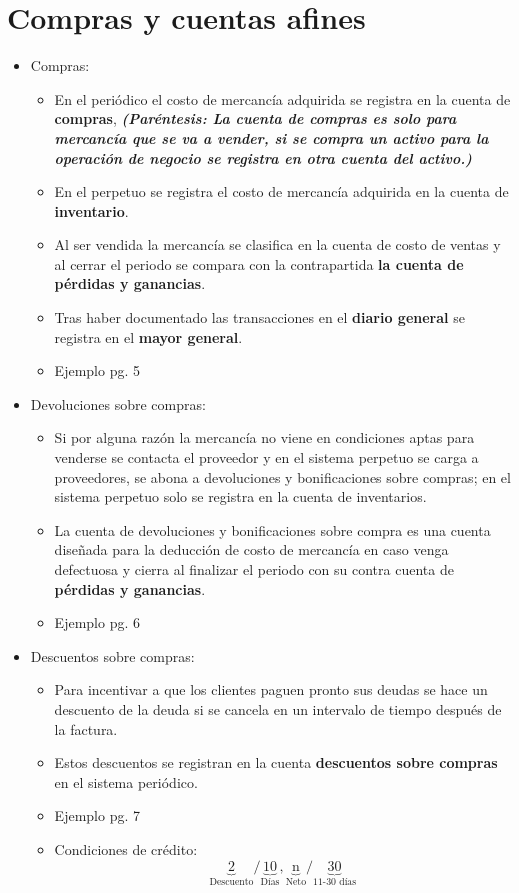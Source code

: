 \documentclass{article}
\begin{document}
\section{Compras y cuentas afines}
\begin{itemize}
    \item Compras:
    \begin{itemize}
        \item En el periódico el costo de mercancía adquirida se registra en la cuenta de \textbf{compras}, \emph{\textbf{(Paréntesis: La cuenta de compras es solo para mercancía que se va a vender, si se compra un activo para la operación de negocio se registra en otra cuenta del activo.}\textbf{)}}
        \item En el perpetuo se registra el costo de mercancía adquirida en la cuenta de \textbf{inventario}.
        \item Al ser vendida la mercancía se clasifica en la cuenta de costo de ventas y al cerrar el periodo se compara con la contrapartida \textbf{la cuenta de pérdidas y ganancias}.
        \item Tras haber documentado las transacciones en el \textbf{diario general} se registra en el  \textbf{mayor general}.
        \item Ejemplo pg. 5
    \end{itemize}
        
    \item Devoluciones sobre compras:
    \begin{itemize}
        \item Si por alguna razón la mercancía no viene en condiciones aptas para venderse se contacta el proveedor y en el sistema perpetuo se carga a proveedores, se abona a devoluciones y bonificaciones sobre compras; en el sistema perpetuo solo se registra en la cuenta de inventarios.
        \item La cuenta de devoluciones y bonificaciones sobre compra es una cuenta diseñada para la deducción de costo de mercancía en caso venga defectuosa y cierra al finalizar el periodo con su contra cuenta de \textbf{pérdidas y ganancias}.
        \item Ejemplo pg. 6
    \end{itemize}


    
    \item Descuentos sobre compras:
    \begin{itemize}
        \item Para incentivar a que los clientes paguen pronto sus deudas se hace un descuento de la deuda si se cancela en un intervalo de tiempo después de la factura.
        \item Estos descuentos se registran en la cuenta \textbf{descuentos sobre compras} en el sistema periódico.
        \item Ejemplo pg. 7
        \item Condiciones de crédito:
        \[
          \underbrace{2}_{\text{Descuento}} / \underbrace{\text{10}}_{\text{Días}}, \underbrace{\text{n}}_{\text{Neto}} / \underbrace{30}_{\text{11-30 días}}
        \]
    \end{itemize}
\end{itemize}
\end{document}
